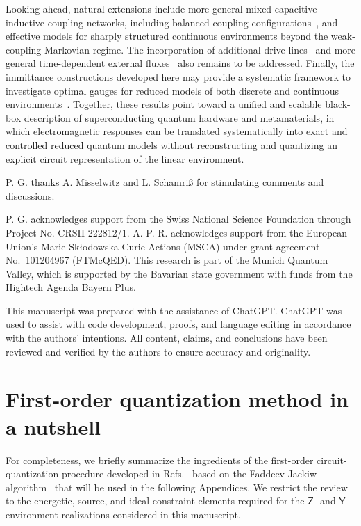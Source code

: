 \documentclass[prx,aps,twocolumn,article]{revtex4-2}
\newcommand{\msf}[1]{\mathsf{#1}}
\newcommand{\msY}{\msf{Y}}
\newcommand{\msZ}{\msf{Z}}
\begin{document}
Looking ahead, natural extensions include more general mixed capacitive-inductive coupling networks, including balanced-coupling configurations~\cite{ParraRodriguez:2018,Sank:2025,Yang:2026}, and effective models for sharply structured continuous environments beyond the weak-coupling Markovian regime. The incorporation of additional drive lines~\cite{Solgun:2019,Solgun:2022,Labarca:2024,Khan:2024} and more general time-dependent external fluxes~\cite{You:2019,Riwar:2022} also remains to be addressed. Finally, the immittance constructions developed here may provide a systematic framework to investigate optimal gauges for reduced models of both discrete and continuous environments~\cite{Manucharyan:2017,DeBernardis:2018,Roth:2019,Mehta:2022,Arwas:2023}. Together, these results point toward a unified and scalable black-box description of superconducting quantum hardware and metamaterials, in which electromagnetic responses can be translated systematically into exact and controlled reduced quantum models without reconstructing and quantizing an explicit circuit representation of the linear environment.

\begin{acknowledgments}
P. G. thanks A. Misselwitz and L. Schamriß for stimulating comments and discussions. 

P. G. acknowledges support from the Swiss National Science Foundation through Project No. CRSII 222812/1. A. P.-R. acknowledges support from the European Union’s Marie Skłodowska-Curie Actions (MSCA) under grant agreement No.~101204967 (FTMcQED). This research is part of the Munich Quantum Valley, which is supported by the Bavarian state government with funds from the Hightech Agenda Bayern Plus.

This manuscript was prepared with the assistance of ChatGPT. ChatGPT was used to assist with code development, proofs, and language editing in accordance with the authors' intentions. All content, claims, and conclusions have been reviewed and verified by the authors to ensure accuracy and originality.

\end{acknowledgments}

\appendix



\section{First-order quantization method in a nutshell}
\label{AppSec:FirstOrderReview}
For completeness, we briefly summarize the ingredients of the first-order circuit-quantization procedure developed in Refs.~\cite{ParraRodriguez:2024,ParraRodriguez:2025} based on the Faddeev-Jackiw algorithm~\cite{Faddeev:1988,Jackiw:1993} that will be used in the following Appendices. We restrict the review to the energetic, source, and ideal constraint elements required for the $\msZ$- and $\msY$-environment realizations considered in this manuscript.
\end{document}
